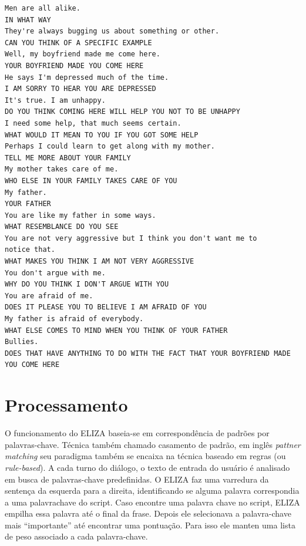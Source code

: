 \documentclass[14pt,a4paper,oneside]{book}
\begin{document}
\begin{lstlisting}[language=Clean, caption=Exemplo de diálogo do ELIZA, label=lst:exemplodialogoeliza]
Men are all alike. 
IN WHAT WAY 
They're always bugging us about something or other. 
CAN YOU THINK OF A SPECIFIC EXAMPLE 
Well, my boyfriend made me come here. 
YOUR BOYFRIEND MADE YOU COME HERE 
He says I'm depressed much of the time. 
I AM SORRY TO HEAR YOU ARE DEPRESSED 
It's true. I am unhappy. 
DO YOU THINK COMING HERE WILL HELP YOU NOT TO BE UNHAPPY 
I need some help, that much seems certain. 
WHAT WOULD IT MEAN TO YOU IF YOU GOT SOME HELP 
Perhaps I could learn to get along with my mother. 
TELL ME MORE ABOUT YOUR FAMILY 
My mother takes care of me. 
WHO ELSE IN YOUR FAMILY TAKES CARE OF YOU 
My father. 
YOUR FATHER 
You are like my father in some ways. 
WHAT RESEMBLANCE DO YOU SEE 
You are not very aggressive but I think you don't want me to 
notice that. 
WHAT MAKES YOU THINK I AM NOT VERY AGGRESSIVE 
You don't argue with me. 
WHY DO YOU THINK I DON'T ARGUE WITH YOU 
You are afraid of me. 
DOES IT PLEASE YOU TO BELIEVE I AM AFRAID OF YOU 
My father is afraid of everybody. 
WHAT ELSE COMES TO MIND WHEN YOU THINK OF YOUR FATHER 
Bullies. 
DOES THAT HAVE ANYTHING TO DO WITH THE FACT THAT YOUR BOYFRIEND MADE YOU COME HERE 
\end{lstlisting}
	




\section{Processamento}

O funcionamento do ELIZA baseia-se em correspondência de padrões por palavras-chave. Técnica também chamado casamento de padrão, em inglês \textit{pattner matching} seu paradigma também se encaixa na técnica baseado em regras (ou \textit{rule-based}). 
A cada turno do diálogo, o texto de entrada do usuário é analisado em busca de palavras-chave predefinidas. 
O ELIZA faz uma varredura da sentença da esquerda para a direita, identificando se alguma palavra correspondia a uma palavra\-chave do script. 
Caso encontre uma palavra chave no script, ELIZA empilha essa palavra até o final da frase. Depois ele selecionava a palavra-chave mais “importante” até encontrar uma pontuação. Para isso ele manten uma lista de peso associado a cada palavra-chave.
\end{document}
